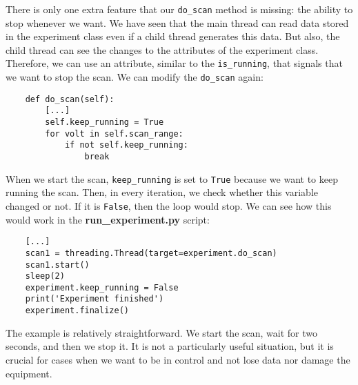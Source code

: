 
There is only one extra feature that our \texttt{do\_scan} method is missing: the ability to stop whenever we want. We have seen that the main thread can read data stored in the experiment class even if a child thread generates this data. But also, the child thread can see the changes to the attributes of the experiment class. Therefore, we can use an attribute, similar to the \texttt{is\_running}, that signals that we want to stop the scan. We can modify the \texttt{do\_scan} again:

\begin{verbatim}
    def do_scan(self):
        [...]
        self.keep_running = True
        for volt in self.scan_range:
            if not self.keep_running:
                break
\end{verbatim}
When we start the scan, \texttt{keep\_running} is set to \texttt{True} because we want to keep running the scan. Then, in every iteration, we check whether this variable changed or not. If it is \texttt{False}, then the loop would stop. We can see how this would work in the \textbf{run\_experiment.py} script:

\begin{verbatim}
    [...]
    scan1 = threading.Thread(target=experiment.do_scan)
    scan1.start()
    sleep(2)
    experiment.keep_running = False
    print('Experiment finished')
    experiment.finalize()
\end{verbatim}

The example is relatively straightforward. We start the scan, wait for two seconds, and then we stop it. It is not a particularly useful situation, but it is crucial for cases when we want to be in control and not lose data nor damage the equipment.

